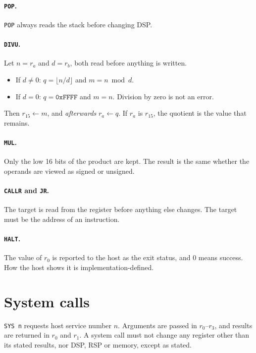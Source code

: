 \documentclass[11pt,a4paper]{article}
\newcommand{\op}[1]{\texttt{#1}}
\newcommand{\hx}[1]{\texttt{0x#1}}
\newcommand{\R}[1]{r_{#1}}
\begin{document}
\paragraph{\op{POP}.} \op{POP} always reads the stack before changing DSP.

\paragraph{\op{DIVU}.}\label{sec:divu}
Let $n = \R{a}$ and $d = \R{b}$, both read before anything is written.
\begin{itemize}[nosep]
\item If $d \ne 0$: $q = \lfloor n/d \rfloor$ and $m = n \bmod d$.
\item If $d = 0$: $q = \hx{FFFF}$ and $m = n$. Division by zero is not
  an error.
\end{itemize}
Then $\R{15} \gets m$, and \emph{afterwards} $\R{a} \gets q$. If
$\R{a}$ is $\R{15}$, the quotient is the value that remains.

\paragraph{\op{MUL}.} Only the low 16 bits of the product are kept. The
result is the same whether the operands are viewed as signed or unsigned.

\paragraph{\op{CALLR} and \op{JR}.} The target is read from the register
before anything else changes. The target must be the address of an
instruction.

\paragraph{\op{HALT}.} The value of $\R{0}$ is reported to the host as the
exit status, and $0$ means success. How the host shows it is implementation-defined.

\section{System calls}\label{sec:sys}

\op{SYS n} requests host service number $n$. Arguments are passed in
$\R{0}$--$\R{3}$, and results are returned in $\R{0}$ and $\R{1}$. A system call must
not change any register other than its stated results, nor DSP, RSP or memory,
except as stated.
\end{document}
